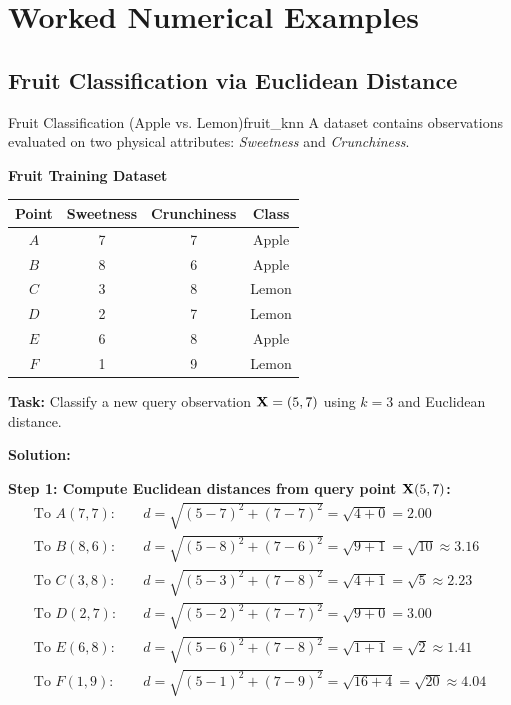 \section{Worked Numerical Examples}

\subsection{Fruit Classification via Euclidean Distance}

\begin{example}{Fruit Classification (Apple vs. Lemon)}{fruit_knn}
A dataset contains observations evaluated on two physical attributes: \textit{Sweetness} and \textit{Crunchiness}.

\begin{center}
\textbf{Fruit Training Dataset}\\[0.3em]
\begin{tabular}{cccc}
\toprule
\textbf{Point} & \textbf{Sweetness} & \textbf{Crunchiness} & \textbf{Class} \\
\midrule
$A$ & 7 & 7 & Apple \\
$B$ & 8 & 6 & Apple \\
$C$ & 3 & 8 & Lemon \\
$D$ & 2 & 7 & Lemon \\
$E$ & 6 & 8 & Apple \\
$F$ & 1 & 9 & Lemon \\
\bottomrule
\end{tabular}
\end{center}

\noindent\textbf{Task:} Classify a new query observation $\mathbf{X} = (5, 7)$ using $k = 3$ and Euclidean distance.

\tcblower
\textbf{Solution:}

\noindent\textbf{Step 1: Compute Euclidean distances from query point $\mathbf{X}(5,7)$:}
\begin{align*}
\text{To } A(7, 7): & \quad d = \sqrt{(5 - 7)^2 + (7 - 7)^2} = \sqrt{4 + 0} = 2.00 \\
\text{To } B(8, 6): & \quad d = \sqrt{(5 - 8)^2 + (7 - 6)^2} = \sqrt{9 + 1} = \sqrt{10} \approx 3.16 \\
\text{To } C(3, 8): & \quad d = \sqrt{(5 - 3)^2 + (7 - 8)^2} = \sqrt{4 + 1} = \sqrt{5} \approx 2.23 \\
\text{To } D(2, 7): & \quad d = \sqrt{(5 - 2)^2 + (7 - 7)^2} = \sqrt{9 + 0} = 3.00 \\
\text{To } E(6, 8): & \quad d = \sqrt{(5 - 6)^2 + (7 - 8)^2} = \sqrt{1 + 1} = \sqrt{2} \approx 1.41 \\
\text{To } F(1, 9): & \quad d = \sqrt{(5 - 1)^2 + (7 - 9)^2} = \sqrt{16 + 4} = \sqrt{20} \approx 4.04
\end{align*}


\end{example}
